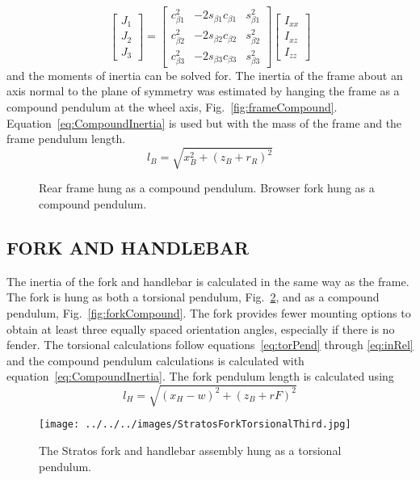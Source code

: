\documentclass{bmd2010p}
\begin{document}
\begin{equation}
	\left[
	\begin{array}{c}
		J_{1}\\
		J_{2}\\
		J_{3}
	\end{array}
	\right]
	=
	\left[
	\begin{array}{ccc}
		c_{\beta 1}^2 & -2s_{\beta 1}c_{\beta 1} & s_{\beta 1}^2\\
		c_{\beta 2}^2 & -2s_{\beta 2}c_{\beta 2} & s_{\beta 2}^2\\
		c_{\beta 3}^2 & -2s_{\beta 3}c_{\beta 3} & s_{\beta 3}^2
	\end{array}
	\right]
	\left[
	\begin{array}{c}
		I_{xx}\\
		I_{xz}\\
		I_{zz}
	\end{array}
	\right]
\label{eq:inRel}
\end{equation}
and the moments of inertia can be solved for.
The inertia of the frame about an axis normal to the plane of symmetry was
estimated by hanging the frame as a compound pendulum at the wheel axis,
Fig.~\ref{fig:frameCompound}. Equation~\ref{eq:CompoundInertia} is used but
with the mass of the frame and the frame pendulum length.
\begin{equation}
    l_B=\sqrt{x_B^2+(z_B+r_R)^2}
    \label{eq:FramePendLength}
\end{equation}
\begin{figure}[tb]
    \centering
        \caption{ Rear frame hung as a compound
        pendulum.  Browser fork hung as a
        compound pendulum.}
        \label{fig:compound}
\end{figure}
\subsection{FORK AND HANDLEBAR}
The inertia of the fork and handlebar is calculated in the same way as the frame. The fork is
hung as both a torsional pendulum, Fig.~\ref{fig:StratosFork}, and as a compound pendulum,
Fig.~\ref{fig:forkCompound}. The fork provides fewer mounting options to
obtain at least three equally spaced orientation angles, especially if there is
no fender. The torsional calculations follow equations~\ref{eq:torPend} through
\ref{eq:inRel} and the compound pendulum calculations is calculated with
equation~\ref{eq:CompoundInertia}. The fork pendulum length is calculated using
\begin{equation}
    l_H=\sqrt{(x_H-w)^2+(z_B+rF)^2}
\end{equation}
\begin{figure}[tb]
    \centering
    \texttt{[image: ../../../images/StratosForkTorsionalThird.jpg]}
    \caption{The Stratos fork and handlebar assembly hung as a torsional
        pendulum.}
    \label{fig:StratosFork}
\end{figure}
\end{document}
